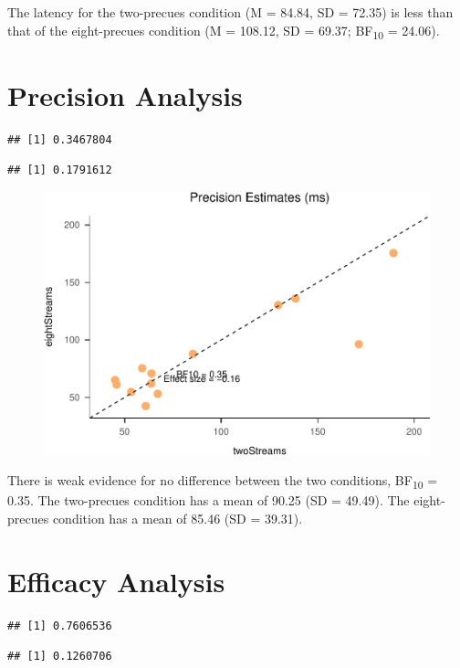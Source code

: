 \documentclass[,man]{apa6}
\theoremstyle{definition}
\theoremstyle{definition}
\theoremstyle{definition}
\theoremstyle{remark}
\begin{document}
The latency for the two-precues condition (M = 84.84, SD = 72.35) is
less than that of the eight-precues condition (M = 108.12, SD = 69.37;
BF\textsubscript{10} = 24.06).

\section{Precision Analysis}\label{precision-analysis-1}

\begin{verbatim}
## [1] 0.3467804
\end{verbatim}

\begin{verbatim}
## [1] 0.1791612
\end{verbatim}

\begin{figure}
\centering
\includegraphics{nStreams_Bayesian_files/figure-latex/unnamed-chunk-9-1.pdf}
\caption{}
\end{figure}

There is weak evidence for no difference between the two conditions,
BF\textsubscript{10} = 0.35. The two-precues condition has a mean of
90.25 (SD = 49.49). The eight-precues condition has a mean of 85.46 (SD
= 39.31).

\section{Efficacy Analysis}\label{efficacy-analysis-1}

\begin{verbatim}
## [1] 0.7606536
\end{verbatim}

\begin{verbatim}
## [1] 0.1260706
\end{verbatim}
\end{document}
